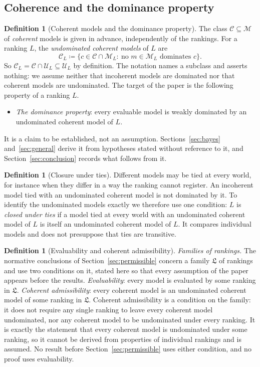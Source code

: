 \documentclass[11pt]{article}
\theoremstyle{definition}
\newtheorem{definition}[theorem]{Definition}
\theoremstyle{remark}
\newcommand{\M}{\mathcal M}
\newcommand{\C}{\mathcal C}
\newcommand{\U}{\mathcal U}
\newcommand{\Lf}{\mathfrak L}
\begin{document}
\subsection{Coherence and the dominance property}
\begin{definition}[Coherent models and the dominance property]\label{def:coherence-property}
The class $\C\subseteq\M$ of \emph{coherent} models is given in advance, independently of the rankings. For a ranking $L$, the \emph{undominated coherent models} of $L$ are
\[
\C_L\coloneqq\{c\in\C\cap\M_L:\ \text{no } m\in\M_L \text{ dominates } c\}.
\]
So $\C_L=\C\cap\U_L\subseteq\U_L$ by definition. The notation names a subclass and asserts nothing: we assume neither that incoherent models are dominated nor that coherent models are undominated. The target of the paper is the following property of a ranking $L$.
\begin{itemize}[leftmargin=*]
\item \emph{The dominance property}: every evaluable model is weakly dominated by an undominated coherent model of $L$.
\end{itemize}
\end{definition}

It is a claim to be established, not an assumption. Sections~\ref{sec:bayes} and~\ref{sec:general} derive it from hypotheses stated without reference to it, and Section~\ref{sec:conclusion} records what follows from it.

\begin{definition}[Closure under ties]\label{def:tie-closure}
Different models may be tied at every world, for instance when they differ in a way the ranking cannot register. An incoherent model tied with an undominated coherent model is not dominated by it. To identify the undominated models exactly we therefore use one condition: $L$ is \emph{closed under ties} if a model tied at every world with an undominated coherent model of $L$ is itself an undominated coherent model of $L$. It compares individual models and does not presuppose that ties are transitive.
\end{definition}

\begin{definition}[Evaluability and coherent admissibility]\label{def:family-assumptions}
\emph{Families of rankings.} The normative conclusions of Section~\ref{sec:permissible} concern a family $\Lf$ of rankings and use two conditions on it, stated here so that every assumption of the paper appears before the results. \emph{Evaluability}: every model is evaluated by some ranking in $\Lf$. \emph{Coherent admissibility}: every coherent model is an undominated coherent model of some ranking in $\Lf$. Coherent admissibility is a condition on the family: it does not require any single ranking to leave every coherent model undominated, nor any coherent model to be undominated under every ranking. It is exactly the statement that every coherent model is undominated under some ranking, so it cannot be derived from properties of individual rankings and is assumed. No result before Section~\ref{sec:permissible} uses either condition, and no proof uses evaluability.
\end{definition}
\end{document}
